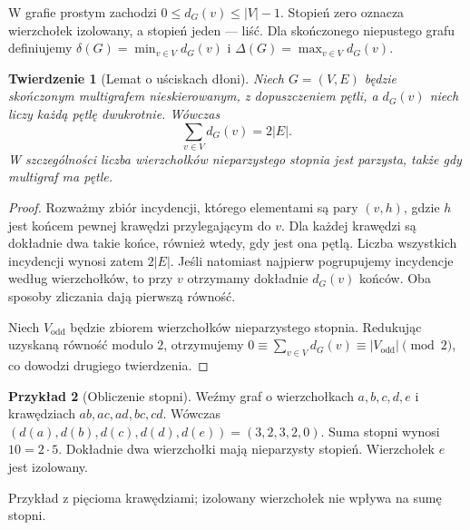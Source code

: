 \documentclass[11pt,a4paper]{report}
\numberwithin{equation}{section}
\theoremstyle{plain}
\newtheorem{twierdzenie}{Twierdzenie}[section]
\theoremstyle{definition}
\newtheorem{przyklad}[twierdzenie]{Przykład}
\theoremstyle{remark}
\begin{document}
W grafie prostym zachodzi $0\le d_G(v)\le |V|-1$.
Stopień zero oznacza wierzchołek izolowany, a stopień jeden
--- liść. Dla skończonego niepustego grafu definiujemy
$\delta(G)=\min_{v\in V}d_G(v)$ i
$\Delta(G)=\max_{v\in V}d_G(v)$.

\begin{twierdzenie}[Lemat o uściskach dłoni]
Niech $G=(V,E)$ będzie skończonym multigrafem
nieskierowanym, z dopuszczeniem pętli, a $d_G(v)$
niech liczy każdą pętlę dwukrotnie. Wówczas
\[
\sum_{v\in V}d_G(v)=2|E|.
\]
W szczególności liczba wierzchołków nieparzystego
stopnia jest parzysta, także gdy multigraf ma pętle.
\end{twierdzenie}

\begin{proof}
Rozważmy zbiór incydencji, którego elementami są pary
$(v,h)$, gdzie $h$ jest końcem pewnej krawędzi przylegającym
do $v$. Dla każdej krawędzi są dokładnie dwa takie końce,
również wtedy, gdy jest ona pętlą. Liczba wszystkich
incydencji wynosi zatem $2|E|$. Jeśli natomiast
najpierw pogrupujemy incydencje według wierzchołków,
to przy $v$ otrzymamy dokładnie $d_G(v)$ końców.
Oba sposoby zliczania dają pierwszą równość.

Niech $V_{\mathrm{odd}}$ będzie zbiorem wierzchołków
nieparzystego stopnia. Redukując uzyskaną równość modulo
$2$, otrzymujemy
$0\equiv\sum_{v\in V}d_G(v)\equiv
|V_{\mathrm{odd}}|\pmod2$, co dowodzi drugiego twierdzenia.
\end{proof}

\begin{przyklad}[Obliczenie stopni]
Weźmy graf o wierzchołkach $a,b,c,d,e$ i krawędziach
$ab,ac,ad,bc,cd$. Wówczas
$(d(a),d(b),d(c),d(d),d(e))=(3,2,3,2,0)$.
Suma stopni wynosi $10=2\cdot5$. Dokładnie dwa
wierzchołki mają nieparzysty stopień. Wierzchołek $e$
jest izolowany.
\end{przyklad}

\begin{center}

{\footnotesize Przykład z pięcioma krawędziami; izolowany
wierzchołek nie wpływa na sumę stopni.}
\end{center}
\end{document}

